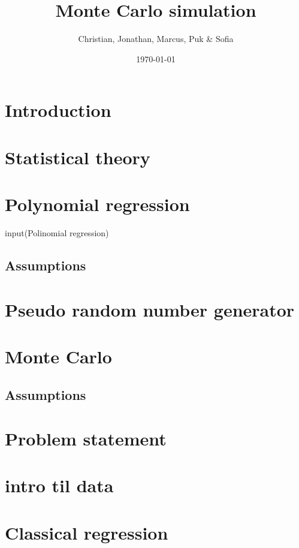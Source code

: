 \documentclass{article}
\title{Monte Carlo simulation}
\author{Christian, Jonathan, Marcus, Puk \& Sofia }
\date{\today}
\begin{document}
	
	
	\setcounter{section}{0}
	\maketitle
	\newpage
	\tableofcontents
	\newpage
	
	\section{Introduction}
	
	\newpage
	
	\section{Statistical theory}
	
	\newpage
	
	\section{Polynomial regression}
 	input(Polinomial regression)
	\newpage
	
	\subsection{Assumptions}
	\newpage
	
	\section{Pseudo random number generator}
	
	\newpage
	
	\section{Monte Carlo}
	\subsection{Assumptions}
	\newpage
	
	\section{Problem statement}
	\newpage
	\section{intro til data}
	
	\newpage
	\section{Classical regression}
	\newpage
	
\end{document}
